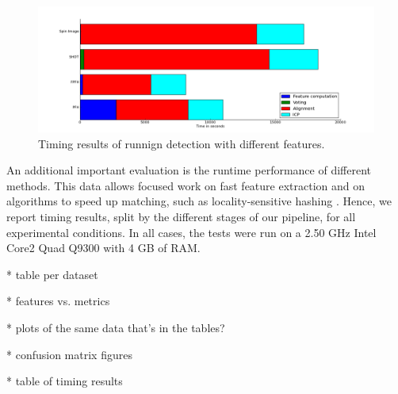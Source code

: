 \begin{figure}[thpb]
\centering
\includegraphics[width=1\linewidth]{../figures/PSB/PFH-FPFH-SHOT-SPIN_IMAGE_timing_test.png}
\caption{Timing results of runnign detection with different features.}
\label{fig:timing}
\end{figure}




An additional important evaluation is the runtime performance of different methods.
This data allows focused work on fast feature extraction and on algorithms to speed up matching, such as locality-sensitive hashing \cite{Frome2004}.
Hence, we report timing results, split by the different stages of our pipeline, for all experimental conditions.
In all cases, the tests were run on a 2.50 GHz Intel Core2 Quad Q9300 with 4 GB of RAM.

* table per dataset

* features vs. metrics

* plots of the same data that's in the tables?

* confusion matrix figures

* table of timing results
